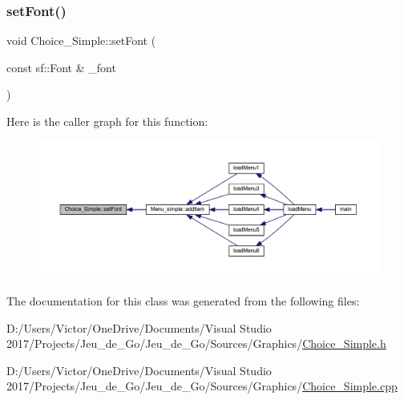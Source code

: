 \subsubsection{\texorpdfstring{set\+Font()}{setFont()}}
{\footnotesize\ttfamily void Choice\+\_\+\+Simple\+::set\+Font (\begin{DoxyParamCaption}\item[{const sf\+::\+Font \&}]{\+\_\+font }\end{DoxyParamCaption})}

Here is the caller graph for this function\+:\nopagebreak
\begin{figure}[H]
\begin{center}
\leavevmode
\includegraphics[width=350pt]{class_choice___simple_a035e32f90e4561b666b6571bce06e207_icgraph}
\end{center}
\end{figure}


The documentation for this class was generated from the following files\+:\begin{DoxyCompactItemize}
\item 
D\+:/\+Users/\+Victor/\+One\+Drive/\+Documents/\+Visual Studio 2017/\+Projects/\+Jeu\+\_\+de\+\_\+\+Go/\+Jeu\+\_\+de\+\_\+\+Go/\+Sources/\+Graphics/\hyperlink{_choice___simple_8h}{Choice\+\_\+\+Simple.\+h}\item 
D\+:/\+Users/\+Victor/\+One\+Drive/\+Documents/\+Visual Studio 2017/\+Projects/\+Jeu\+\_\+de\+\_\+\+Go/\+Jeu\+\_\+de\+\_\+\+Go/\+Sources/\+Graphics/\hyperlink{_choice___simple_8cpp}{Choice\+\_\+\+Simple.\+cpp}\end{DoxyCompactItemize}
